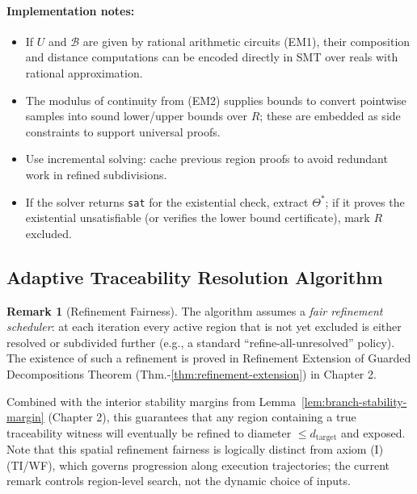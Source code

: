 \documentclass[12pt]{article}
\theoremstyle{definition}
\newtheorem{remark}{Remark}[section]
\theoremstyle{plain}
\begin{document}
\paragraph{Implementation notes:}
\begin{itemize}[itemsep=1pt]
  \item If \(U\) and \(\mathcal B\) are given by rational arithmetic circuits (EM1), their composition and distance computations can be encoded directly in SMT over reals with rational approximation.  
  \item The modulus of continuity from (EM2) supplies bounds to convert pointwise samples into sound lower/upper bounds over \(R\); these are embedded as side constraints to support universal proofs.  
  \item Use incremental solving: cache previous region proofs to avoid redundant work in refined subdivisions.  
  \item If the solver returns \texttt{sat} for the existential check, extract \(\Theta^*\); if it proves the existential unsatisfiable (or verifies the lower bound certificate), mark \(R\) excluded.  
\end{itemize}


\subsection{Adaptive Traceability Resolution Algorithm}

\begin{remark}[Refinement Fairness]
\label{rem:refinement-fairness}
The algorithm assumes a \emph{fair refinement scheduler}: at each iteration every active region that is not yet excluded is either resolved or subdivided further (e.g., a standard ``refine-all-unresolved'' policy). The existence of such a refinement is proved in Refinement Extension of Guarded Decompositions Theorem (Thm.-\ref{thm:refinement-extension}) in Chapter 2.

Combined with the interior stability margins from Lemma~\ref{lem:branch-stability-margin} (Chapter 2), this guarantees that any region containing a true traceability witness will eventually be refined to diameter \(\le d_{\mathrm{target}}\) and exposed. Note that this spatial refinement fairness is logically distinct from axiom (I) (TI/WF), which governs progression along execution trajectories; the current remark controls region-level search, not the dynamic choice of inputs.
\end{remark}
\end{document}
